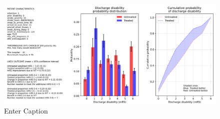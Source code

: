 \begin{figure}
    \centering
    \includegraphics[width=1.0\linewidth]{images/prototype_patient_ideal}
    \caption{Enter Caption}
    \label{fig:example_patient_outcome}
\end{figure}

